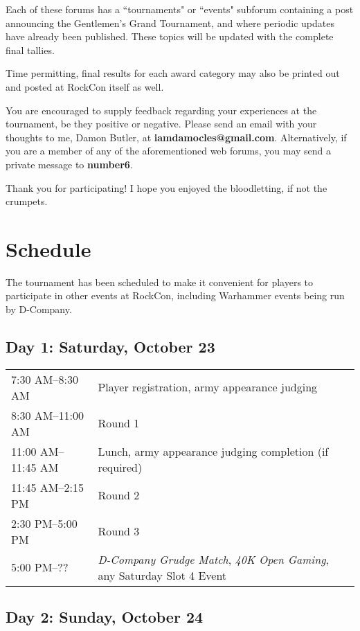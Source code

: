 \documentclass[12pt,titlepage]{article}
\begin{document}
Each of these forums has a ``tournaments" or ``events" subforum containing a post announcing the Gentlemen's Grand Tournament, and where periodic updates have already been published. These topics will be updated with the complete final tallies.

Time permitting, final results for each award category may also be printed out and posted at RockCon itself as well.

You are encouraged to supply feedback regarding your experiences at the tournament, be they positive or negative. Please send an email with your thoughts to me, Damon Butler, at \textbf{iamdamocles@gmail.com}. Alternatively, if you are a member of any of the aforementioned web forums, you may send a private message to \textbf{number6}.

Thank you for participating! I hope you enjoyed the bloodletting, if not the crumpets.

\newpage

\section*{Schedule}

The tournament has been scheduled to make it convenient for players to participate in other events at RockCon, including Warhammer events being run by D-Company.

\subsection*{Day 1: Saturday, October 23}

\begin{tabular}[t]{@{}l@{\quad}l@{}}
\phantom{1}7:30 AM--\phantom{1}8:30 AM & Player registration, army appearance judging \\
\phantom{1}8:30 AM--11:00 AM & Round 1 \\
11:00 AM--11:45 AM & Lunch, army appearance judging completion (if required) \\
11:45 AM--\phantom{1}2:15 PM & Round 2 \\
\phantom{1}2:30 PM--\phantom{1}5:00 PM &  Round 3 \\
\phantom{1}5:00 PM--\phantom{10:}?? & \textit{D-Company Grudge Match}, \textit{40K Open Gaming}, any Saturday Slot 4 Event
\end{tabular}

\subsection*{Day 2: Sunday, October 24}
\end{document}
